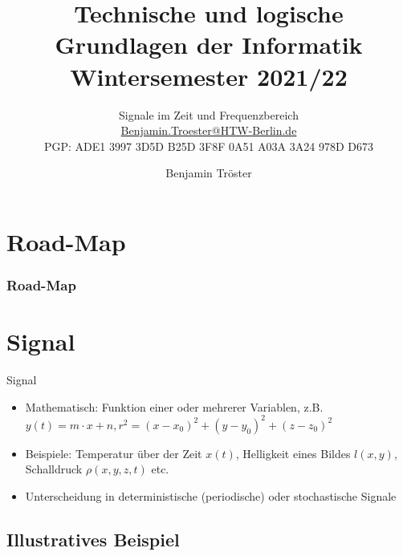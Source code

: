 \documentclass[xcolor=dvipsnames,aspectratio=169]{beamer}
\begin{document}

\title{Technische und logische Grundlagen der Informatik\\Wintersemester 2021/22}
\subtitle{Signale im Zeit und Frequenzbereich\\

\href{mailto:Benjamin.Troester@HTW-Berlin.de}{Benjamin.Troester@HTW-Berlin.de}\\
		PGP: ADE1 3997 3D5D B25D 3F8F 0A51 A03A 3A24 978D D673 }

\author{Benjamin Tröster}

\date{}

\begin{frame}
\titlepage
\end{frame}

\section*{Road-Map}
\begin{frame}
\frametitle{Road-Map}
\begin{multicols}{2}
  \tableofcontents
\end{multicols}
\end{frame}

\section{Signal}
\begin{frame}{Signal}
\begin{itemize}
\begin{definition}[Signal]
  		Informationstragende, physikalische Größe, die sich über der Zeit, über dem Ort oder über einer anderen Variablen ändert.
\end{definition}
	\item Mathematisch: Funktion einer oder mehrerer Variablen, z.B. $ y(t) = m\cdot x + n, r^2 = (x - x_0)^2 + (y - y_0)^2 + (z - z_0)^2$ 
	\item Beispiele: Temperatur über der Zeit $x(t)$, Helligkeit eines Bildes $l(x,y)$, Schalldruck $\rho(x,y,z,t)$ etc.
	\item Unterscheidung in deterministische (periodische) oder stochastische Signale
\end{itemize}
\end{frame}


\subsection{Illustratives Beispiel}
\end{document}
